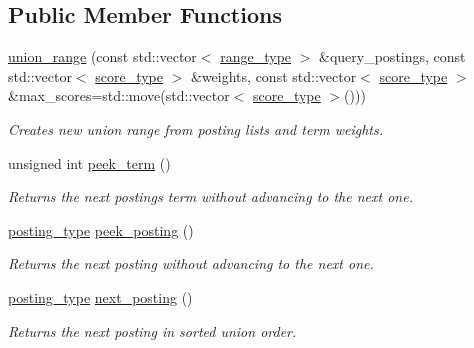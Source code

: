 \subsection*{Public Member Functions}
\begin{DoxyCompactItemize}
\item 
\mbox{\hyperlink{classirk_1_1union__range_a64113cb12f111b46248be984b3ca16c2}{union\+\_\+range}} (const std\+::vector$<$ \mbox{\hyperlink{classirk_1_1union__range_aae1621f1e73b1b78990ad11eaa52452b}{range\+\_\+type}} $>$ \&query\+\_\+postings, const std\+::vector$<$ \mbox{\hyperlink{classirk_1_1union__range_af728218b976df464ebb051a9e5358e93}{score\+\_\+type}} $>$ \&weights, const std\+::vector$<$ \mbox{\hyperlink{classirk_1_1union__range_af728218b976df464ebb051a9e5358e93}{score\+\_\+type}} $>$ \&max\+\_\+scores=std\+::move(std\+::vector$<$ \mbox{\hyperlink{classirk_1_1union__range_af728218b976df464ebb051a9e5358e93}{score\+\_\+type}} $>$()))
\begin{DoxyCompactList}\small\item\em Creates new union range from posting lists and term weights. \end{DoxyCompactList}\item 
unsigned int \mbox{\hyperlink{classirk_1_1union__range_a0b771d0ee6fb2ac3c04be8a2d2d47b33}{peek\+\_\+term}} ()
\begin{DoxyCompactList}\small\item\em Returns the next posting\textquotesingle{}s term without advancing to the next one. \end{DoxyCompactList}\item 
\mbox{\hyperlink{classirk_1_1union__range_ac125c83e17d473ee5480fef76cfe42f9}{posting\+\_\+type}} \mbox{\hyperlink{classirk_1_1union__range_a634d96d13219c2856a6bedf37cd8f1de}{peek\+\_\+posting}} ()
\begin{DoxyCompactList}\small\item\em Returns the next posting without advancing to the next one. \end{DoxyCompactList}\item 
\mbox{\hyperlink{classirk_1_1union__range_ac125c83e17d473ee5480fef76cfe42f9}{posting\+\_\+type}} \mbox{\hyperlink{classirk_1_1union__range_a3513c7a28c0e241a6f9ccfc5bf7b6e67}{next\+\_\+posting}} ()
\begin{DoxyCompactList}\small\item\em Returns the next posting in sorted union order. \end{DoxyCompactList}\item 

\end{DoxyCompactItemize}
